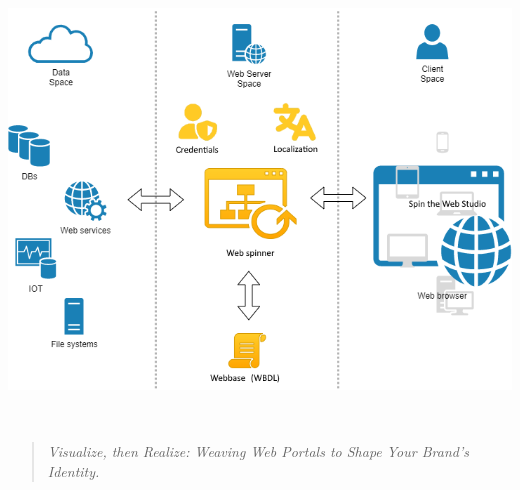 \begin{titlepage}
\centering

\makeatletter
{\Huge\bfseries \@title\\[0.5cm]}

\ifx\@subtitle\@empty\else
{\Large \@subtitle\\[1.5cm]}
\fi

{\large\textsc{\@author}\\[2cm]}

{\large \@date\\[2cm]}
\makeatother

\includegraphics[width=\textwidth]{figures/spin-the-web.png}

\vspace*{1cm}

\vfill

{\large \organization\\[0.5cm]}

\begin{quote}
\centering
\textit{Visualize, then Realize: Weaving Web Portals to Shape Your Brand’s Identity.}
\end{quote}

\end{titlepage}

